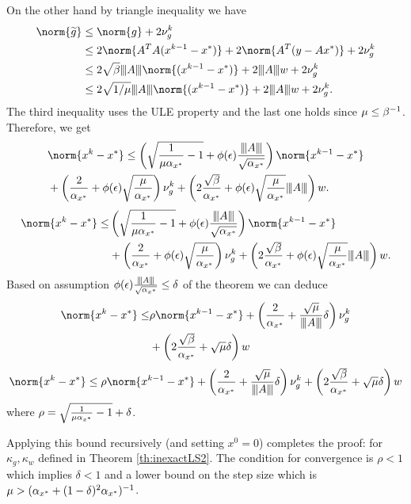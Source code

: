 On the other hand by triangle inequality we have
\begin{align*}
	\norm{\g}&\leq \norm{g}+2\nug^k\\
	&\leq 2\norm{A^TA(x^{k-1}-x^\gt)}+2\norm{A^T(y-Ax^\gt)}+2\nug^k \\
	&\leq 2\sqrt \MM\vertiii{A}\norm{(x^{k-1}-x^\gt)}+2\vertiii{A}w+2\nug^k\\
	&\leq 2\sqrt{ 1/\mu}\vertiii{A}\norm{(x^{k-1}-x^\gt)}+2\vertiii{A}w+2\nug^k.
\end{align*}
The third inequality uses the ULE property and the last one holds since $\mu\leq \beta^{-1}$.
Therefore, we get
\ifCLASSOPTIONtwocolumn
\begin{align*}
&\norm{x^k-x^\gt}\leq
\left(\sqrt{\frac{1}{\mu\mmx}-1}+ \phi(\epsilon)\frac{\vertiii{A}}{\sqrt{\mmx}}\right) \norm{x^{k-1}-x^\gt} \\
&+ \left( \frac{2}{\mmx} +\phi(\epsilon){\sqrt{\frac{\mu}{\mmx}}}\right) \nug^k 
+ \left( 2\frac{\sqrt{\MM}}{\mmx}+ \phi(\epsilon)\sqrt{\frac{\mu}{\mmx}} \vertiii{A} \right)w. 
\end{align*}
\else
\begin{align*}
\norm{x^k-x^\gt}\leq&
\left(\sqrt{\frac{1}{\mu\mmx}-1}+ \phi(\epsilon)\frac{\vertiii{A}}{\sqrt{\mmx}}\right) \norm{x^{k-1}-x^\gt} \\
&+ \left( \frac{2}{\mmx} +\phi(\epsilon){\sqrt{\frac{\mu}{\mmx}}}\right) \nug^k 
+ \left( 2\frac{\sqrt{\MM}}{\mmx}+ \phi(\epsilon)\sqrt{\frac{\mu}{\mmx}} \vertiii{A} \right)w. 
\end{align*}
\fi
Based on assumption $\phi(\epsilon)\frac{{\left\vert\kern-0.25ex\left\vert\kern-0.25ex\left\vert A \right\vert\kern-0.25ex\right\vert\kern-0.25ex\right\vert}}{\sqrt{\alpha_{x^*}}}\leq \delta$ of the theorem  we can deduce
\ifCLASSOPTIONtwocolumn
\begin{align*}
\norm{x^k-x^\gt}\leq&
\rho \norm{x^{k-1}-x^\gt} + \left( \frac{2}{\mmx} +\frac{\sqrt \mu}{\vertiii{A}} \delta\right) \nug^k \\
&
+ \left( 2\frac{\sqrt{\MM}}{\mmx}+\sqrt{\mu}\delta \right)w 
\end{align*}
\else
\begin{align*}
\norm{x^k-x^\gt}\leq
\rho \norm{x^{k-1}-x^\gt} + \left( \frac{2}{\mmx} +\frac{\sqrt \mu}{\vertiii{A}} \delta\right) \nug^k 
+ \left( 2\frac{\sqrt{\MM}}{\mmx}+\sqrt{\mu}\delta \right)w 
\end{align*}
\fi
where $\rho=\sqrt{\frac{1}{\mu\alpha_{x^*}}-1}+\delta$.

Applying this bound recursively (and setting $x^0=0$) completes the proof:
for $\kappa_g, \kappa_w$ defined in Theorem \ref{th:inexactLS2}. The condition for convergence is $\rho<1$ which implies $\delta<1$ and a lower bound on the step size which is $\mu> (\alpha_{x^*}+(1-\delta)^2\alpha_{x^*})^{-1}$. 
		